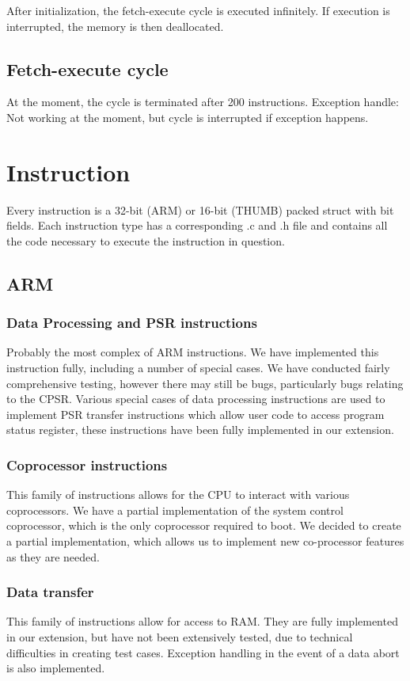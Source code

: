 \documentclass{article}
\begin{document}
After initialization, the fetch-execute cycle is executed infinitely. If execution is interrupted, the memory is then deallocated.

\subsection{Fetch-execute cycle}
At the moment, the cycle is terminated after 200 instructions.
Exception handle: Not working at the moment, but cycle is interrupted if exception happens.

\section{Instruction}
Every instruction is a 32-bit (ARM) or 16-bit (THUMB) packed struct with bit  fields. Each instruction type has a corresponding .c and .h file and contains all the code necessary to execute the instruction in question.

\subsection{ARM}
\subsubsection{Data Processing and PSR instructions}
Probably the most complex of ARM instructions. We have implemented this instruction fully, including a number of special cases. We have conducted fairly comprehensive testing, however there may still be bugs, particularly bugs relating to the CPSR. Various special cases of data processing instructions are used to implement PSR transfer instructions which allow user code to access program status register, these instructions have been fully implemented in our extension.
\subsubsection{Coprocessor instructions}
This family of instructions allows for the CPU to interact with various coprocessors. We have a partial implementation of the system control coprocessor, which is the only coprocessor required to boot. We decided to create a partial implementation, which allows us to implement new co-processor features as they are needed. 
\subsubsection{Data transfer}
This family of instructions allow for access to RAM. They are fully implemented in our extension, but have not been extensively tested, due to technical difficulties in creating test cases. Exception handling in the event of a data abort is also implemented.
\end{document}

